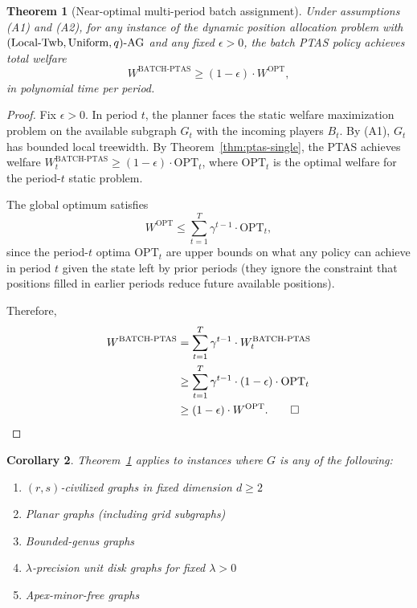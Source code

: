 \documentclass[11pt]{article}
\newtheorem{theorem}{Theorem}
\newtheorem{corollary}[theorem]{Corollary}
\newcommand{\OPT}{\mathrm{OPT}}
\newcommand{\BATCH}{\mathrm{BATCH}}
\begin{document}
\begin{theorem}[Near-optimal multi-period batch assignment]
  \label{thm:pom-upper-bound}
  Under assumptions (A1) and (A2), for any instance of the dynamic position
  allocation problem with $(\textup{Local-Twb}, \textup{Uniform}, q)\text{-}\mathrm{AG}$
  and any fixed $\epsilon > 0$, the batch PTAS policy achieves total welfare
  \begin{equation}
    W^{\BATCH\text{-PTAS}} \geq (1 - \epsilon) \cdot W^{\OPT},
  \end{equation}
  in polynomial time per period.
\end{theorem}

\begin{proof}
  Fix $\epsilon > 0$.
  In period $t$, the planner faces the static welfare maximization problem on the
  available subgraph $G_t$ with the incoming players $B_t$.
  By (A1), $G_t$ has bounded local treewidth.
  By Theorem~\ref{thm:ptas-single}, the PTAS achieves welfare
  $W_t^{\BATCH\text{-PTAS}} \geq (1 - \epsilon) \cdot \OPT_t$,
  where $\OPT_t$ is the optimal welfare for the period-$t$ static problem.

  The global optimum satisfies
  \begin{equation}
    W^{\OPT} \leq \sum_{t=1}^T \gamma^{t-1} \cdot \OPT_t,
  \end{equation}
  since the period-$t$ optima $\OPT_t$ are upper bounds on what any policy can achieve
  in period $t$ given the state left by prior periods (they ignore the constraint that
  positions filled in earlier periods reduce future available positions).

  Therefore,
  \begin{align}
    W^{\BATCH\text{-PTAS}}
      &= \sum_{t=1}^T \gamma^{t-1} \cdot W_t^{\BATCH\text{-PTAS}} \\
      &\geq \sum_{t=1}^T \gamma^{t-1} \cdot (1-\epsilon) \cdot \OPT_t \\
      &\geq (1 - \epsilon) \cdot W^{\OPT}. \qed
  \end{align}
\end{proof}

\begin{corollary}
  \label{cor:upper-classes}
  Theorem~\ref{thm:pom-upper-bound} applies to instances where $G$ is any of the
  following:
  \begin{enumerate}[label=(\arabic*)]
    \item $(r,s)$-civilized graphs in fixed dimension $d \geq 2$
    \item Planar graphs (including grid subgraphs)
    \item Bounded-genus graphs
    \item $\lambda$-precision unit disk graphs for fixed $\lambda > 0$
    \item Apex-minor-free graphs
  \end{enumerate}
\end{corollary}
\end{document}
